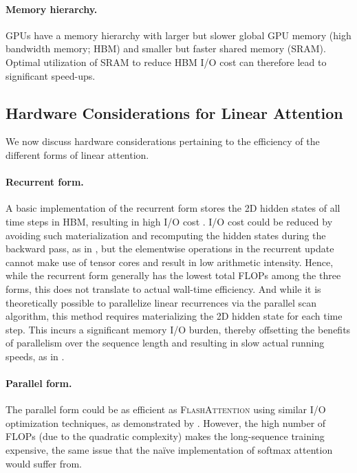 \vspace{-2mm}
\paragraph{Memory hierarchy.} GPUs have a memory hierarchy with larger but slower global GPU memory (high bandwidth memory; HBM) and smaller but faster shared memory (SRAM). Optimal utilization of SRAM to reduce HBM I/O cost can therefore lead to significant speed-ups.







\vspace{-2mm}
\subsection{Hardware Considerations for Linear Attention}
\vspace{-2mm}
We now discuss hardware considerations pertaining to the efficiency of the different forms of linear attention.  

\vspace{-2mm}
\paragraph{Recurrent form.}  A basic implementation of the recurrent form  stores the 2D hidden states of all time steps in HBM, resulting in  high I/O cost \cite{mao-2022-fine}. I/O cost could be reduced by avoiding such materialization and recomputing the hidden states during the backward pass, as in \citet{katharopoulos2020transformers}, but the elementwise operations in the recurrent update cannot make use of tensor cores and result in low arithmetic intensity. Hence, while the recurrent form generally has the lowest total FLOPs among the three forms, this does not translate to actual wall-time efficiency.  And while it is theoretically possible to parallelize  linear recurrences via the parallel scan algorithm, this method requires materializing the 2D hidden state for each time step. This  incurs a significant memory I/O burden, thereby offsetting the benefits of parallelism over the sequence length and resulting in slow actual running speeds, as in 
 \citet{gatedloop}. 



\vspace{-2mm}
\paragraph{Parallel form.} The parallel form could be as efficient as \textsc{FlashAttention} using similar I/O optimization techniques, as demonstrated by \citet{qin2023scaling}. However, the high number of FLOPs (due to the quadratic complexity) makes the long-sequence training expensive, the same issue that the na\"ive implementation of softmax attention would suffer from. %

